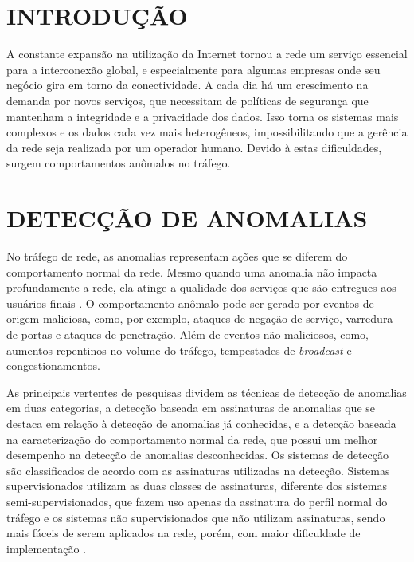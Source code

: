 \documentclass[article,12pt,oneside,a4paper,english,brazil]{unifil}
\begin{document}
\textual
\fontsize{12}{7}\selectfont
\begin{Spacing}{1.5}

\section*{INTRODUÇÃO}

A constante expansão na utilização da Internet tornou a rede um serviço essencial para a interconexão global, e especialmente para algumas empresas onde seu negócio gira em torno da conectividade. A cada dia há um crescimento na demanda por novos serviços, que necessitam de políticas de segurança que mantenham a integridade e a privacidade dos dados. Isso torna os sistemas mais complexos e os dados cada vez mais heterogêneos, impossibilitando que a gerência da rede seja realizada por um operador humano. Devido à estas dificuldades, surgem comportamentos anômalos no tráfego.

\section*{DETECÇÃO DE ANOMALIAS}

No tráfego de rede, as anomalias representam ações que se diferem do comportamento normal da rede. Mesmo quando uma anomalia não impacta profundamente a rede, ela atinge a qualidade dos serviços que são entregues aos usuários finais \cite{Lakhina2004}. O comportamento anômalo pode ser gerado por eventos de origem maliciosa, como, por exemplo, ataques de negação de serviço, varredura de portas e ataques de penetração. Além de eventos não maliciosos, como, aumentos repentinos no volume do tráfego, tempestades de \textit{broadcast} e congestionamentos.

As principais vertentes de pesquisas dividem as técnicas de detecção de anomalias em duas categorias, a detecção baseada em assinaturas de anomalias que se destaca em relação à detecção de anomalias já conhecidas, e a detecção baseada na caracterização do comportamento normal da rede, que possui um melhor desempenho na detecção de anomalias desconhecidas. Os sistemas de detecção são classificados de acordo com as assinaturas utilizadas na detecção. Sistemas supervisionados utilizam as duas classes de assinaturas, diferente dos sistemas semi-supervisionados, que fazem uso apenas da assinatura do perfil normal do tráfego e os sistemas não supervisionados que não utilizam assinaturas, sendo mais fáceis de serem aplicados na rede, porém, com maior dificuldade de implementação \cite{chandola2009}.


\end{Spacing}
\end{document}
